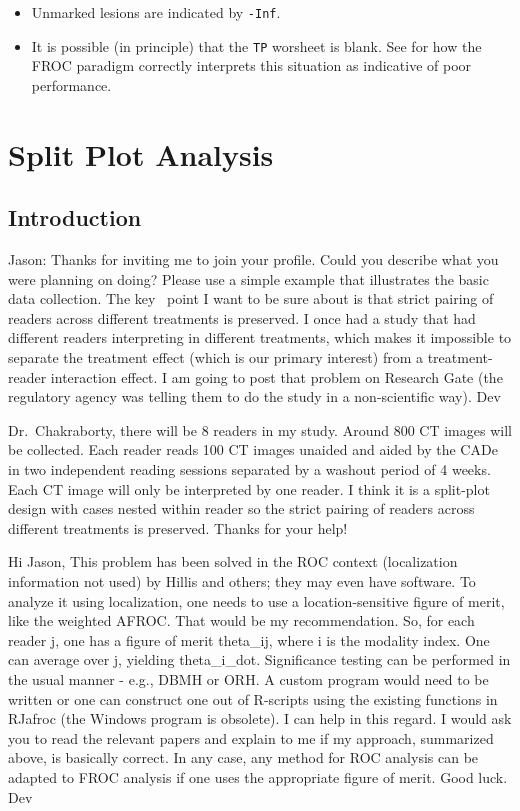 \documentclass[]{book}
\providecommand{\tightlist}{%
  \setlength{\itemsep}{0pt}\setlength{\parskip}{0pt}}
\begin{document}
\begin{itemize}
\tightlist
\item
  Unmarked lesions are indicated by \texttt{-Inf}.
\item
  It is possible (in principle) that the \texttt{TP} worsheet is blank. See \citep{RN2680} for how the FROC paradigm correctly interprets this situation as indicative of poor performance.
\end{itemize}

\hypertarget{split-plot-analysis}{%
\chapter{Split Plot Analysis}\label{split-plot-analysis}}

\hypertarget{introduction-2}{%
\section{Introduction}\label{introduction-2}}

Jason:
Thanks for inviting me to join your profile. Could you describe what you were planning on doing? Please use a simple example that illustrates the basic data collection. The key ~point I want to be sure about is that strict pairing of readers across different treatments is preserved. I once had a study that had different readers interpreting in different treatments, which makes it impossible to separate the treatment effect (which is our primary interest) from a treatment-reader interaction effect. I am going to post that problem on Research Gate (the regulatory agency was telling them to do the study in a non-scientific way). Dev

Dr.~Chakraborty, there will be 8 readers in my study. Around 800 CT images will be collected. Each reader reads 100 CT images unaided and aided by the CADe in two independent reading sessions separated by a washout period of 4 weeks. Each CT image will only be interpreted by one reader. I think it is a split-plot design with cases nested within reader so the strict pairing of readers across different treatments is preserved. Thanks for your help!

Hi Jason,
This problem has been solved in the ROC context (localization information not used) by Hillis and others; they may even have software. To analyze it using localization, one needs to use a location-sensitive figure of merit, like the weighted AFROC. That would be my recommendation. So, for each reader j, one has a figure of merit theta\_ij, where i is the modality index. One can average over j, yielding theta\_i\_dot. Significance testing can be performed in the usual manner - e.g., DBMH or ORH. A custom program would need to be written or one can construct one out of R-scripts using the existing functions in RJafroc (the Windows program is obsolete). I can help in this regard. I would ask you to read the relevant papers and explain to me if my approach, summarized above, is basically correct. In any case, any method for ROC analysis can be adapted to FROC analysis if one uses the appropriate figure of merit. Good luck. Dev
\end{document}
